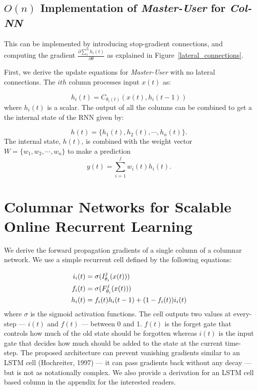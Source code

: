 \documentclass{article}
\newcommand{\algoname}{\textit{Master-User} }
\newcommand{\archi}{\textit{Col-NN} }
\begin{document}
 \subsection{$O(n)$ Implementation of \algoname for \archi}
 This can be implemented by introducing stop-gradient connections, and computing the gradient $\frac{\partial \sum_i^n h_i(t)}{\partial \theta}$ as explained in Figure~\ref{lateral_connections}. 
 
 First, we derive the update equations for \algoname with no lateral connections. The $ith$ column processes input $x(t)$ as:
  
  \begin{equation*}
        h_i(t) = C_{\theta_i(t)}(x(t), h_i(t-1))
  \end{equation*}
  where $h_i(t)$ is a scalar. The output of all the columns can be combined to get a the internal state of the RNN given by:
 
 \begin{equation*}
     h(t)= \{h_1(t), h_2(t), \cdots, h_n(t)\}.
 \end{equation*}
The internal state, $h(t)$, is combined with the weight vector  $W=\{w_1, w_2, \cdots, w_n\}$ to make a prediction 
\begin{equation*}
    y(t) = \sum_{i=1}^j w_i(t) h_i(t).
\end{equation*}

 

\section{Columnar Networks for Scalable Online Recurrent Learning}
We derive the forward propagation gradients of a single column of a columnar network. We use a simple recurrent cell defined by the following equations:


\begin{align}
i_i(t) &= \sigma( I_{\theta_i}^j (x(t))) \notag \\
f_i(t) &= \sigma( F_{\theta_i}^j (x(t))) \notag \\
h_i(t) &= f_i(t)h_i(t-1) + (1 - f_i(t))i_i(t) \label{state_update}
\end{align}
where $\sigma$ is the sigmoid activation functions. The cell outputs two values at every-step --- $i(t)$ and $f(t)$ --- between 0 and 1. $f(t)$ is the forget gate that controls how much of the old state should be forgotten whereas $i(t)$ is the input gate that decides how much should be added to the state at the current time-step. The proposed architecture can prevent vanishing gradients similar to an LSTM cell (Hochreiter, 1997) --- it can pass gradients back without any decay --- but is not as notationally complex. We also provide a derivation for an LSTM cell based column in the appendix for the interested readers. 
\end{document}
